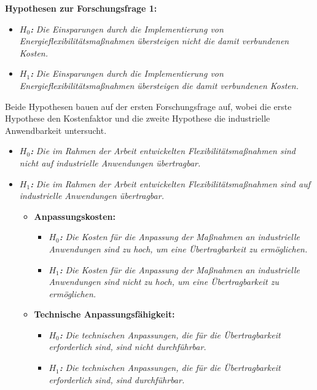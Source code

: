 \textbf{Hypothesen zur Forschungsfrage 1:}
\begin{itemize}[label={--}]
	\item \textbf{\textit{$H_0$:}} \textit{Die Einsparungen durch die Implementierung von Energieflexibilitätsmaßnahmen übersteigen nicht die damit verbundenen Kosten.}
	\item \textbf{\textit{$H_1$:}} \textit{Die Einsparungen durch die Implementierung von Energieflexibilitätsmaßnahmen übersteigen die damit verbundenen Kosten.}
\end{itemize}

Beide Hypothesen bauen auf der ersten Forschungsfrage auf, wobei die erste Hypothese den Kostenfaktor und die zweite Hypothese die industrielle Anwendbarkeit untersucht.

\begin{itemize}[label={--}]
	\item \textbf{\textit{$H_0$:}} \textit{Die im Rahmen der Arbeit entwickelten Flexibilitätsmaßnahmen sind nicht auf industrielle Anwendungen übertragbar.}
	\item \textbf{\textit{$H_1$:}} \textit{Die im Rahmen der Arbeit entwickelten Flexibilitätsmaßnahmen sind auf industrielle Anwendungen übertragbar.}\\
	\begin{itemize}
		\item \textbf{Anpassungskosten:}
		\begin{itemize}
			\item \textbf{\textit{$H_0$:}} \textit{Die Kosten für die Anpassung der Maßnahmen an industrielle Anwendungen sind zu hoch, um eine Übertragbarkeit zu ermöglichen.}
			\item \textbf{\textit{$H_1$:}} \textit{Die Kosten für die Anpassung der Maßnahmen an industrielle Anwendungen sind nicht zu hoch, um eine Übertragbarkeit zu ermöglichen.}
		\end{itemize}
		\item \textbf{Technische Anpassungsfähigkeit:}
		\begin{itemize}
			\item \textbf{\textit{$H_0$:}} \textit{Die technischen Anpassungen, die für die Übertragbarkeit erforderlich sind, sind nicht durchführbar.}
			\item \textbf{\textit{$H_1$:}} \textit{Die technischen Anpassungen, die für die Übertragbarkeit erforderlich sind, sind durchführbar.}\\\\
		\end{itemize}
	\end{itemize}
\end{itemize}

